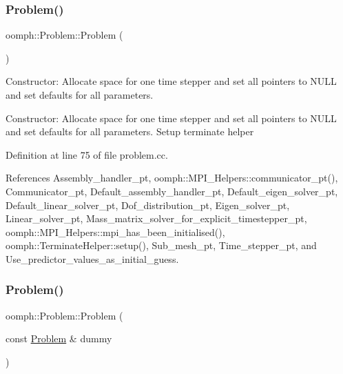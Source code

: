 \subsubsection{\texorpdfstring{Problem()}{Problem()}\hspace{0.1cm}{\footnotesize\ttfamily [1/2]}}
{\footnotesize\ttfamily oomph\+::\+Problem\+::\+Problem (\begin{DoxyParamCaption}{ }\end{DoxyParamCaption})}



Constructor\+: Allocate space for one time stepper and set all pointers to N\+U\+LL and set defaults for all parameters. 

Constructor\+: Allocate space for one time stepper and set all pointers to N\+U\+LL and set defaults for all parameters. Setup terminate helper 

Definition at line 75 of file problem.\+cc.



References Assembly\+\_\+handler\+\_\+pt, oomph\+::\+M\+P\+I\+\_\+\+Helpers\+::communicator\+\_\+pt(), Communicator\+\_\+pt, Default\+\_\+assembly\+\_\+handler\+\_\+pt, Default\+\_\+eigen\+\_\+solver\+\_\+pt, Default\+\_\+linear\+\_\+solver\+\_\+pt, Dof\+\_\+distribution\+\_\+pt, Eigen\+\_\+solver\+\_\+pt, Linear\+\_\+solver\+\_\+pt, Mass\+\_\+matrix\+\_\+solver\+\_\+for\+\_\+explicit\+\_\+timestepper\+\_\+pt, oomph\+::\+M\+P\+I\+\_\+\+Helpers\+::mpi\+\_\+has\+\_\+been\+\_\+initialised(), oomph\+::\+Terminate\+Helper\+::setup(), Sub\+\_\+mesh\+\_\+pt, Time\+\_\+stepper\+\_\+pt, and Use\+\_\+predictor\+\_\+values\+\_\+as\+\_\+initial\+\_\+guess.

\mbox{\label{classoomph_1_1Problem_a0ff735963d632b344d2172f9777fbfed}} 
\subsubsection{\texorpdfstring{Problem()}{Problem()}\hspace{0.1cm}{\footnotesize\ttfamily [2/2]}}
{\footnotesize\ttfamily oomph\+::\+Problem\+::\+Problem (\begin{DoxyParamCaption}\item[{const \hyperlink{classoomph_1_1Problem}{Problem} \&}]{dummy }\end{DoxyParamCaption})\hspace{0.3cm}{\ttfamily [inline]}}




